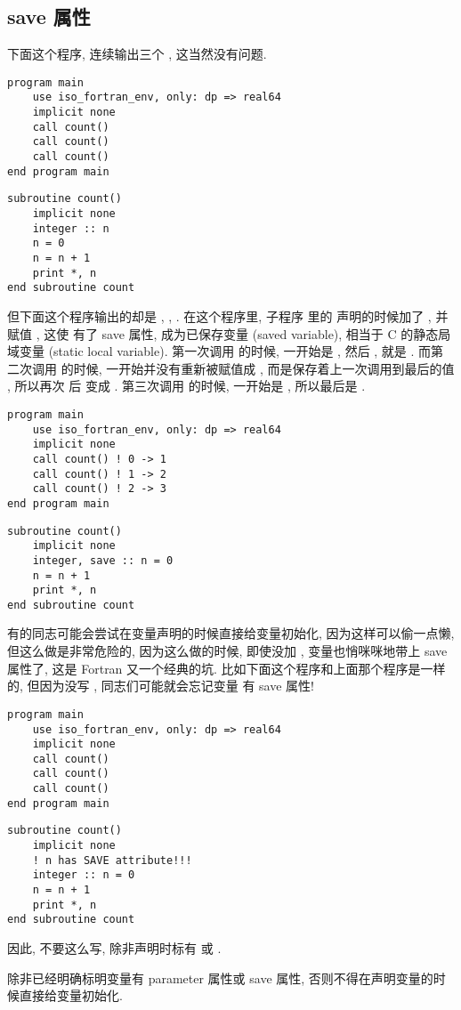 \subsection{save 属性} 

下面这个程序, 连续输出三个 , 这当然没有问题. 
\begin{lstlisting} 
program main
    use iso_fortran_env, only: dp => real64
    implicit none
    call count()
    call count()
    call count()
end program main
\end{lstlisting}
\begin{lstlisting}
subroutine count()
    implicit none
    integer :: n
    n = 0
    n = n + 1
    print *, n
end subroutine count
\end{lstlisting} 
但下面这个程序输出的却是 , , . 在这个程序里, 子程序  里的  声明的时候加了 , 并赋值 , 这使  有了 save 属性, 成为已保存变量 (saved variable), 相当于 C 的静态局域变量 (static local variable). 第一次调用  的时候,  一开始是 , 然后 ,  就是 . 而第二次调用  的时候,  一开始并没有重新被赋值成 , 而是保存着上一次调用到最后的值 , 所以再次  后  变成 . 第三次调用  的时候,  一开始是 , 所以最后是 . 
\begin{lstlisting} 
program main
    use iso_fortran_env, only: dp => real64
    implicit none
    call count() ! 0 -> 1
    call count() ! 1 -> 2
    call count() ! 2 -> 3
end program main
\end{lstlisting}
\begin{lstlisting}
subroutine count()
    implicit none
    integer, save :: n = 0
    n = n + 1
    print *, n
end subroutine count
\end{lstlisting} 
有的同志可能会尝试在变量声明的时候直接给变量初始化, 因为这样可以偷一点懒, 但这么做是非常危险的, 因为这么做的时候, 即使没加 , 变量也悄咪咪地带上 save 属性了, 这是 Fortran 又一个经典的坑. 比如下面这个程序和上面那个程序是一样的, 但因为没写 , 同志们可能就会忘记变量  有 save 属性!
\begin{lstlisting} 
program main
    use iso_fortran_env, only: dp => real64
    implicit none
    call count()
    call count()
    call count()
end program main
\end{lstlisting}
\begin{lstlisting}
subroutine count()
    implicit none
    ! n has SAVE attribute!!!
    integer :: n = 0 
    n = n + 1
    print *, n
end subroutine count
\end{lstlisting} 
因此, 不要这么写, 除非声明时标有  或 . 
\begin{convention} 
    除非已经明确标明变量有 parameter 属性或 save 属性, 否则不得在声明变量的时候直接给变量初始化. 
\end{convention} 


